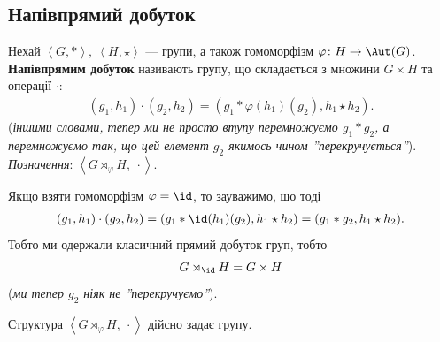 \documentclass{math_library}
\begin{document}
\subsection{Напівпрямий добуток}
\begin{definition}
Нехай $\left<G,*\right>,\ \left<H, \star\right>$ --- групи, а також гомоморфізм $\varphi \colon H \to \Aut(G)$.\\
\textbf{Напівпрямим добуток} називають групу, що складається з множини $G \times H$ та операції $\cdot$:
\begin{align*}
(g_1,h_1) \cdot (g_2,h_2) = (g_1*\varphi(h_1)(g_2), h_1 \star h_2).
\end{align*}
(\textit{іншими словами, тепер ми не просто втупу перемножуємо $g_1*g_2$, а перемножуємо так, що цей елемент $g_2$ якимось чином ''перекручується''}).\\
\textit{Позначення}: $\left<G \rtimes_\varphi H,\ \cdot\right>$.
\end{definition}

\begin{remark}
Якщо взяти гомоморфізм $\varphi = \id$, то зауважимо, що тоді
\begin{align*}
(g_1,h_1) \cdot (g_2,h_2) = (g_1*\id(h_1)(g_2), h_1 \star h_2) = (g_1*g_2, h_1 \star h_2).
\end{align*}
Тобто ми одержали класичний прямий добуток груп, тобто
\[
G \rtimes_{\id} H = G \times H
\]
(\textit{ми тепер $g_2$ ніяк не ''перекручуємо''}).
\end{remark}

\begin{proposition}
Структура $\left<G \rtimes_\varphi H,\ \cdot\right>$ дійсно задає групу.
\end{proposition}
\end{document}
